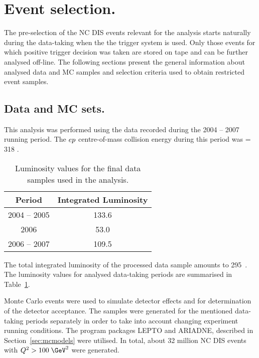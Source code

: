 \section{Event selection.}
The pre-selection of the NC DIS events relevant for the analysis starts naturally during the data-taking when the the \zeus trigger system is used. Only those events for which positive trigger decision was taken are stored on tape and can be further analysed off-line. The following sections present the general information about analysed data and MC samples and selection criteria used to obtain restricted event samples.

\subsection{Data and MC sets.}
This analysis was performed using the data recorded during the 2004 -- 2007 running period. The $\mbox{$e p$}$ centre-of-mass collision energy during this period was \sqs = 318 \GeV.
\begin{table}
	\centering
		\begin{tabular}[h]{c|c}
		  \hline
			Period & Integrated Luminosity \\
			\hline \hline
			2004 -- 2005  & 133.6 \invpb  \\
			2006             & 53.0 \invpb   \\
			2006 -- 2007  & 109.5 \invpb \\
			\hline
		\end{tabular}
	\caption{Luminosity values for the final data samples used in the analysis.}
	\label{tab:selecteddatasample}
\end{table}
The total integrated luminosity of the processed data sample amounts to 295~\invpb. The luminosity values for analysed data-taking periods are summarised in Table~\ref{tab:selecteddatasample}.

Monte Carlo events were used to simulate detector effects and for determination of the detector acceptance. The samples were generated for the mentioned data-taking periods separately in order to take into account changing experiment running conditions. The program packages LEPTO and ARIADNE, described in Section~\ref{sec:mcmodels} were utilised. In total, about 32 million NC DIS events with $\qsq > 100\;\GeV^2$ were generated.

